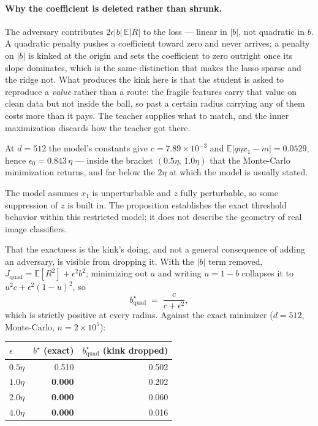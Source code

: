 \paragraph{Why the coefficient is deleted rather than shrunk.} The adversary contributes
$2\epsilon\lvert b\rvert\,\mathbb{E}\lvert R\rvert$ to the loss --- linear in $\lvert b\rvert$, not
quadratic in $b$. A quadratic penalty pushes a coefficient toward zero and never arrives; a penalty on
$\lvert b\rvert$ is kinked at the origin and sets the coefficient to zero outright once its slope
dominates, which is the same distinction that makes the lasso sparse and the ridge not. What produces
the kink here is that the student is asked to reproduce a \emph{value} rather than a route: the
fragile features carry that value on clean data but not inside the ball, so past a certain radius
carrying any of them costs more than it pays. The teacher supplies what to match, and the inner
maximization discards how the teacher got there.

At $d=512$ the model's constants give $c = 7.89\times10^{-3}$ and
$\mathbb{E}\lvert q\eta x_1 - m\rvert = 0.0529$, hence $\epsilon_0 = 0.843\,\eta$ --- inside the
bracket $(0.5\eta,\,1.0\eta)$ that the Monte-Carlo minimization returns, and far below the $2\eta$ at
which the model is usually stated.

The model assumes $x_1$ is unperturbable and $z$ fully perturbable, so some suppression of $z$ is
built in. The proposition establishes the exact threshold behavior within this restricted model;
it does not describe the geometry of real image classifiers.

That the exactness is the kink's doing, and not a general consequence of adding an adversary, is
visible from dropping it. With the $\lvert b\rvert$ term removed,
$J_{\mathrm{quad}} = \mathbb{E}[R^2] + \epsilon^2 b^2$; minimizing out $a$ and writing $u = 1-b$
collapses it to $u^2 c + \epsilon^2(1-u)^2$, so
\begin{equation}
b^\star_{\mathrm{quad}} \;=\; \frac{c}{c+\epsilon^2},
\label{eqn:bquad}
\end{equation}
which is strictly positive at every radius. Against the exact minimizer ($d=512$, Monte-Carlo,
$n = 2\times10^5$):

\begin{center}\small
\begin{tabular}{lrr}
  \toprule
  $\epsilon$ & $b^\star$ (exact) & $b^\star_{\mathrm{quad}}$ (kink dropped) \\
  \midrule
  $0.5\eta$ & 0.510 & 0.502 \\
  $1.0\eta$ & \textbf{0.000} & 0.202 \\
  $2.0\eta$ & \textbf{0.000} & 0.060 \\
  $4.0\eta$ & \textbf{0.000} & 0.016 \\
  \bottomrule
\end{tabular}
\end{center}


